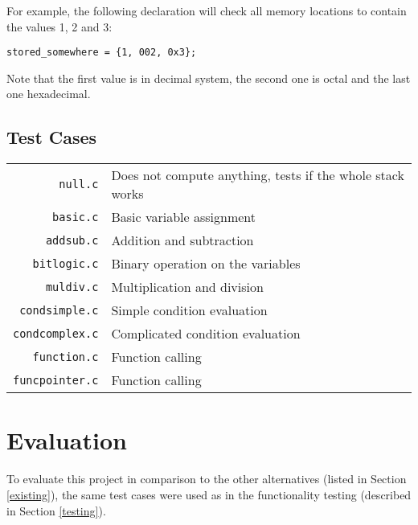             For example, the following declaration will check all memory locations to contain the values 1, 2 and 3:

            \begin{center}
                \texttt{stored\_somewhere = \{1, 002, 0x3\};}
            \end{center}

            Note that the first value is in decimal system, the second one is octal and the last one hexadecimal.

        \subsection{Test Cases}

            \begin{center}
            \begin{tabular}{ r | l }
                \texttt{null.c} & Does not compute anything, tests if the whole stack works \\
                \texttt{basic.c} & Basic variable assignment \\
                \texttt{addsub.c} & Addition and subtraction \\
                \texttt{bitlogic.c} & Binary operation on the variables \\
                \texttt{muldiv.c} & Multiplication and division \\
                \texttt{condsimple.c} & Simple condition evaluation \\
                \texttt{condcomplex.c} & Complicated condition evaluation \\
                \texttt{function.c} & Function calling \\
                \texttt{funcpointer.c} & Function calling \\
            \end{tabular}
            \end{center}

    \section{Evaluation}

    To evaluate this project in comparison to the other alternatives (listed in Section \ref{existing}), the same test cases were used as in the functionality testing (described in Section \ref{testing}).

